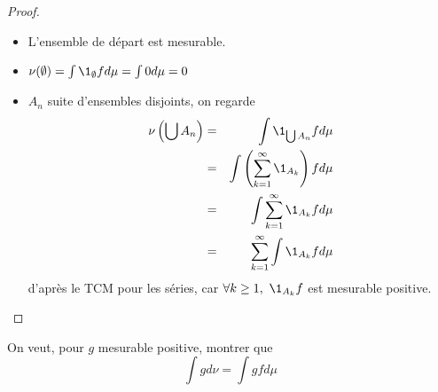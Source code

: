 \begin{proof}
	\begin{itemize}
		\item L'ensemble de départ est mesurable.
		\item $\nu(\emptyset) = \int \1_{\emptyset} f d\mu = \int 0 d \mu = 0$
		\item $A_n$ suite d'ensembles disjoints, on regarde
		      \begin{eqnarray*}
			      \nu\left(\bigcup A_n\right) &=& \int \1_{\bigcup A_n} f d\mu \\
			      &=& \int \left( \sum_{k=1}^{\infty} \1_{A_k} \right) f d\mu \\
			      &=& \int \sum_{k=1}^{\infty} \1_{A_k} f d\mu \\
			      &=& \sum_{k=1}^{\infty} \int \1_{A_k} f d\mu
		      \end{eqnarray*}
		      d'après le TCM pour les séries, car $\forall k \geq 1, \ \1_{A_k}f$ est mesurable positive.
	\end{itemize}
\end{proof}

\begin{remarque} \label{rem:transfert}
	On veut, pour $g$ mesurable positive, montrer que
	$$ \int g d\nu = \int g f d\mu $$
\end{remarque}

